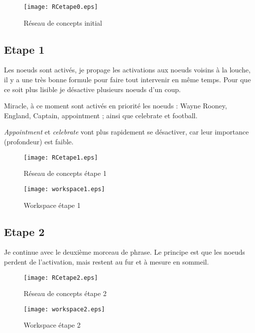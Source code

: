 \documentclass{article}           %
\begin{document}
\begin{figure}[htp]
 \centering
  \texttt{[image: RCetape0.eps]}
 \caption{Réseau de concepts initial}
 \label{fig:RC0}
\end{figure}

 

 
 \subsection{Etape 1}
 Les noeuds sont activés, je propage les activations aux noeuds voisins à la louche, il y a une très bonne formule pour faire tout intervenir en même temps. Pour que ce soit plus lisible je désactive plusieurs noeuds d'un coup.

 Miracle, à ce moment sont activés en priorité les noeuds : Wayne Rooney, England, Captain, appointment ; ainsi que celebrate et football.
 
 \textit{Appointment} et \textit{celebrate} vont plus rapidement se désactiver, car leur importance (profondeur) est faible.

\begin{figure}[htp]
 \centering
  \texttt{[image: RCetape1.eps]}
 \caption{Réseau de concepts étape 1}
 \label{fig:RC1}
\end{figure}

\begin{figure}[htp]
 \centering
  \texttt{[image: workspace1.eps]}
 \caption{Workspace étape 1}
 \label{fig:W1}
\end{figure}


 \subsection{Etape 2}

 Je continue avec le deuxième morceau de phrase. Le principe est que les noeuds perdent de l'activation, mais restent au fur et à mesure en sommeil.
 
 \begin{figure}[htp]
 \centering
  \texttt{[image: RCetape2.eps]}
 \caption{Réseau de concepts étape 2}
 \label{fig:RC2}
\end{figure}

\begin{figure}[htp]
 \centering
  \texttt{[image: workspace2.eps]}
 \caption{Workspace étape 2}
 \label{fig:W2}
\end{figure}
\end{document}
